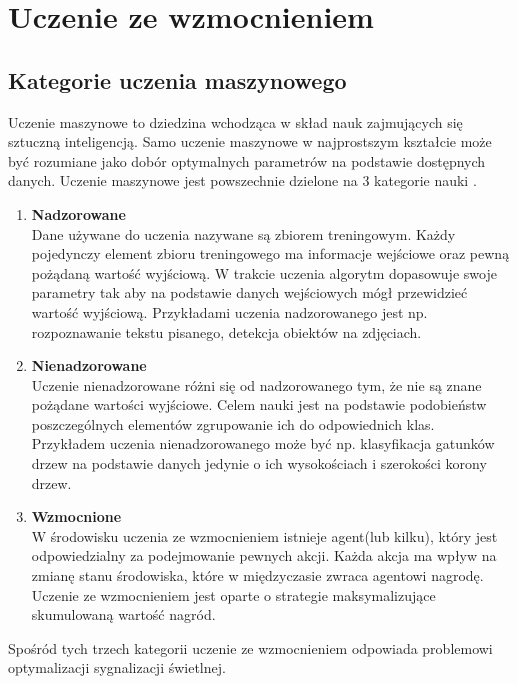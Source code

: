\documentclass[12pt]{book}
\theoremstyle{plain}
\begin{document}
\chapter{Uczenie ze wzmocnieniem} \label{chapter:reinforcement}
\section{Kategorie uczenia maszynowego}
Uczenie maszynowe to dziedzina wchodząca w skład nauk zajmujących się sztuczną inteligencją\cite{ml_ai}. Samo uczenie maszynowe w najprostszym kształcie może być rozumiane jako dobór optymalnych parametrów na podstawie dostępnych danych. Uczenie maszynowe jest powszechnie dzielone na 3 kategorie nauki \cite{machineLearningClassification}.
\begin{enumerate}
	\item \textbf{Nadzorowane} \\
	Dane używane do uczenia nazywane są zbiorem treningowym. Każdy pojedynczy element zbioru treningowego ma informacje wejściowe oraz pewną pożądaną wartość wyjściową. W trakcie uczenia algorytm dopasowuje swoje parametry tak aby na podstawie danych wejściowych mógł przewidzieć wartość wyjściową. Przykładami uczenia nadzorowanego jest np. rozpoznawanie tekstu pisanego, detekcja obiektów na zdjęciach.
	\item \textbf{Nienadzorowane} \\
	Uczenie nienadzorowane różni się od nadzorowanego tym, że nie  są znane pożądane wartości wyjściowe. Celem nauki jest na podstawie podobieństw poszczególnych elementów zgrupowanie ich do odpowiednich klas. Przykładem uczenia nienadzorowanego może być np. klasyfikacja gatunków drzew na podstawie danych jedynie o ich wysokościach i szerokości korony drzew.
	\item \textbf{Wzmocnione} \\
	W środowisku uczenia ze wzmocnieniem istnieje agent(lub kilku), który jest odpowiedzialny za podejmowanie pewnych akcji. Każda akcja ma wpływ na zmianę stanu środowiska, które w międzyczasie zwraca agentowi nagrodę. Uczenie ze wzmocnieniem jest oparte o strategie maksymalizujące skumulowaną wartość nagród.
\end{enumerate}
Spośród tych trzech kategorii uczenie ze wzmocnieniem odpowiada problemowi optymalizacji sygnalizacji świetlnej.
\end{document}
